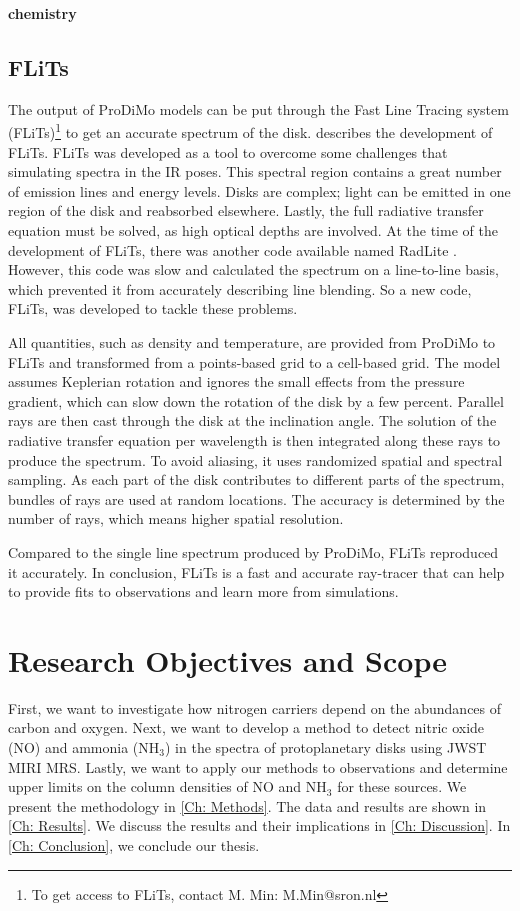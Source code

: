 \documentclass[twoside, single, authoryear, semicolon, 12pt]{lion-msc}
\newcommand{\4}{$_4$}
\newcommand{\3}{$_3$}
\newcommand{\2}{$_2$}
\begin{document}
\textbf{chemistry}

\subsection{FLiTs}
The output of ProDiMo models can be put through the Fast Line Tracing system (FLiTs)\footnote{To get access to FLiTs, contact M. Min: M.Min@sron.nl} to get an accurate spectrum of the disk. \cite{Woitke_2018} describes the development of FLiTs. FLiTs was developed as a tool to overcome some challenges that simulating spectra in the IR poses. This spectral region contains a great number of emission lines and energy levels. Disks are complex; light can be emitted in one region of the disk and reabsorbed elsewhere. Lastly, the full radiative transfer equation must be solved, as high optical depths are involved. At the time of the development of FLiTs, there was another code available named RadLite \citep{Pontoppidan_2009}. However, this code was slow and 
calculated the spectrum on a line-to-line basis, which prevented it from accurately describing line blending. So a new code, FLiTs, was developed to tackle these problems. 

All quantities, such as density and temperature, are provided from ProDiMo to FLiTs and transformed from a points-based grid to a cell-based grid. The model assumes Keplerian rotation and ignores the small effects from the pressure gradient, which can slow down the rotation of the disk by a few percent. Parallel rays are then cast through the disk at the inclination angle. The solution of the radiative transfer equation per wavelength is then integrated along these rays to produce the spectrum. To avoid aliasing, it uses randomized spatial and spectral sampling. As each part of the disk contributes to different parts of the spectrum, bundles of rays are used at random locations. The accuracy is determined by the number of rays, which means higher spatial resolution.

Compared to the single line spectrum produced by ProDiMo, FLiTs reproduced it accurately. In conclusion, FLiTs is a fast and accurate ray-tracer that can help to provide fits to observations and learn more from simulations.

\section{Research Objectives and Scope}
First, we want to investigate how nitrogen carriers depend on the abundances of carbon and oxygen. Next, we want to develop a method to detect nitric oxide (NO) and ammonia (NH\3) in the spectra of protoplanetary disks using JWST MIRI MRS. Lastly, we want to apply our methods to observations and determine upper limits on the column densities of NO and NH\3 for these sources. 
We present the methodology in \autoref{Ch: Methods}. The data and results are shown in \autoref{Ch: Results}. We discuss the results and their implications in \autoref{Ch: Discussion}. In \autoref{Ch: Conclusion}, we conclude our thesis.
\end{document}
